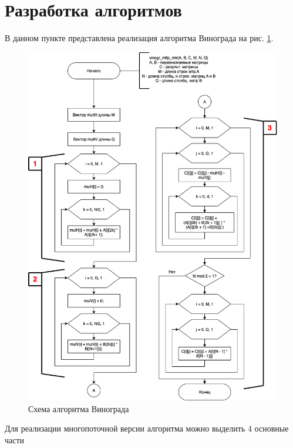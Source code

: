 \documentclass[12pt, a4paper]{report}
\begin{document}
	\section{Разработка алгоритмов}
	
	\hspace{0.6cm}В данном пункте представлена реализация алгоритма Винограда на рис. \ref{scheme}. 
	
	\newpage
	
	\begin{figure}[ht!]
		\label{scheme}
		\centering
		\includegraphics[scale=0.6]{scheme.png}
		\caption{Схема алгоритма Винограда}
	\end{figure}



	\newpage
	
	Для реализации многопоточной версии алгоритма можно выделить 4 основные части
	
\end{document}

